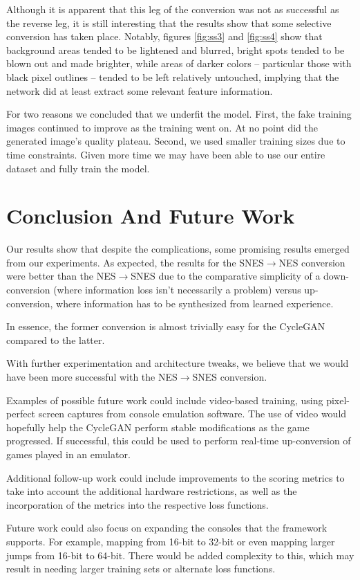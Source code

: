 \documentclass[10pt,twocolumn,letterpaper]{article}
\begin{document}
Although it is apparent that this leg of the conversion was not as successful as the reverse leg, it is still interesting that the results show that some selective conversion has taken place. Notably, figures \ref{fig:ss3} and \ref{fig:ss4} show that background areas tended to be lightened and blurred, bright spots tended to be blown out and made brighter, while areas of darker colors \--- particular those with black pixel outlines \--- tended to be left relatively untouched, implying that the network did at least extract some relevant feature information.

For two reasons we concluded that we underfit the model. First, the fake training images continued to improve as the training went on. At no point did the generated image's quality plateau. Second, we used smaller training sizes due to time constraints. Given more time we may have been able to use our entire dataset and fully train the model.
\section{Conclusion And Future Work}
Our results show that despite the complications, some promising results emerged from our experiments. As expected, the results for the SNES$\rightarrow$NES conversion were better than the NES$\rightarrow$SNES due to the comparative simplicity of a down-conversion (where information loss isn't necessarily a problem) versus up-conversion, where information has to be synthesized from learned experience.

In essence, the former conversion is almost trivially easy for the CycleGAN compared to the latter.

With further experimentation and architecture tweaks, we believe that we would have been more successful with the NES$\rightarrow$SNES conversion.

Examples of possible future work could include video-based training, using pixel-perfect screen captures from console emulation software. The use of video would hopefully help the CycleGAN perform stable modifications as the game progressed. If successful, this could be used to perform real-time up-conversion of games played in an emulator.

Additional follow-up work could include improvements to the scoring metrics to take into account the additional hardware restrictions, as well as the incorporation of the metrics into the respective loss functions.

Future work could also focus on expanding the consoles that the framework supports. For example, mapping from 16-bit to 32-bit or even mapping larger jumps from 16-bit to 64-bit. There would be added complexity to this, which may result in needing larger training sets or alternate loss functions.
\end{document}
